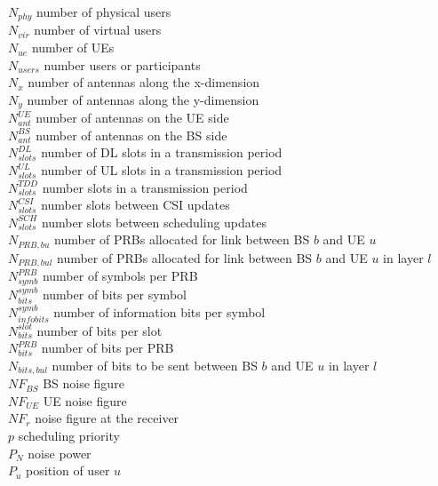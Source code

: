$N_{phy}$ \mytab number of physical users \\
$N_{vir}$ \mytab number of virtual users \\
$N_{ue}$ \mytab number of \acsp{UE} \\
$N_{users}$ \mytab number users or participants \\
$N_x$ \mytab number of antennas along the x-dimension\\
$N_y$ \mytab number of antennas along the y-dimension\\
$N_{ant}^{UE}$ \mytab number of antennas on the \acs{UE} side\\
$N_{ant}^{BS}$ \mytab number of antennas on the \acs{BS} side\\
$N^{DL}_{slots}$ \mytab number of \acs{DL} slots in a transmission period\\
$N^{UL}_{slots}$ \mytab number of \acs{UL} slots in a transmission period\\
$N^{TDD}_{slots}$ \mytab number slots in a transmission period\\
$N^{CSI}_{slots}$ \mytab number slots between \acs{CSI} updates\\
$N^{SCH}_{slots}$ \mytab number slots between scheduling updates\\
$N_{PRB, bu}$ \mytab number of PRBs allocated for link between BS $b$ and UE $u$ \\
$N_{PRB, bul}$ \mytab number of PRBs allocated for link between BS $b$ and UE $u$ in layer $l$\\
$N_{symb}^{PRB}$ \mytab number of symbols per PRB \\
$N_{bits}^{symb}$ \mytab number of bits per symbol \\
$N_{info bits}^{symb}$ \mytab number of information bits per symbol \\
$N_{bits}^{slot}$ \mytab number of bits per slot \\
$N_{bits}^{PRB}$ \mytab number of bits per PRB \\
$N_{bits, bul}$ \mytab number of bits to be sent between BS $b$ and UE $u$ in layer $l$\\
$NF_{BS}$ \mytab BS noise figure \\
$NF_{UE}$ \mytab UE noise figure\\
$NF_{r}$ \mytab noise figure at the receiver\\
$p$ \mytab scheduling priority\\
$P_N$ \mytab noise power \\
$P_u$ \mytab position of user $u$ \\
